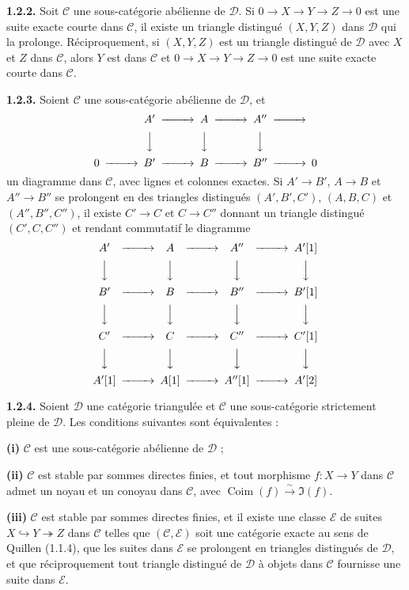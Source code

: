 \documentclass[12pt,a4paper]{article}
\theoremstyle{plain}
\theoremstyle{definition}
\theoremstyle{remark}
\DeclareMathOperator{\Coim}{Coim}
\newcommand{\cC}{\mathcal{C}}
\newcommand{\cD}{\mathcal{D}}
\newcommand{\cE}{\mathcal{E}}
\begin{document}
\smallskip

\noindent
\textbf{1.2.2.} Soit $\cC$ une sous-catégorie abélienne de $\cD$. Si $0 \to X \to Y \to Z \to 0$ est une suite exacte courte dans $\cC$, il existe un triangle distingué $(X, Y, Z)$ dans $\cD$ qui la prolonge. Réciproquement, si $(X, Y, Z)$ est un triangle distingué de $\cD$ avec $X$ et $Z$ dans $\cC$, alors $Y$ est dans $\cC$ et $0 \to X \to Y \to Z \to 0$ est une suite exacte courte dans $\cC$.

\smallskip

\noindent
\textbf{1.2.3.} Soient $\cC$ une sous-catégorie abélienne de $\cD$, et
\[
\begin{CD}
@. A' @>>> A @>>> A'' @>>> \\
@. @VVV @VVV @VVV @. \\
0 @>>> B' @>>> B @>>> B'' @>>> 0
\end{CD}
\]
un diagramme dans $\cC$, avec lignes et colonnes exactes. Si $A' \to B'$, $A \to B$ et $A'' \to B''$ se prolongent en des triangles distingués $(A', B', C')$, $(A, B, C)$ et $(A'', B'', C'')$, il existe $C' \to C$ et $C \to C''$ donnant un triangle distingué $(C', C, C'')$ et rendant commutatif le diagramme
\[
\begin{CD}
A' @>>> A @>>> A'' @>>> A'[1] \\
@VVV @VVV @VVV @VVV \\
B' @>>> B @>>> B'' @>>> B'[1] \\
@VVV @VVV @VVV @VVV \\
C' @>>> C @>>> C'' @>>> C'[1] \\
@VVV @VVV @VVV @VVV \\
A'[1] @>>> A[1] @>>> A''[1] @>>> A'[2]
\end{CD}
\]

\smallskip

\noindent
\textbf{1.2.4.} Soient $\cD$ une catégorie triangulée et $\cC$ une sous-catégorie strictement pleine de $\cD$. Les conditions suivantes sont équivalentes :

\smallskip

\noindent
\textbf{(i)} $\cC$ est une sous-catégorie abélienne de $\cD$ ;

\noindent
\textbf{(ii)} $\cC$ est stable par sommes directes finies, et tout morphisme $f : X \to Y$ dans $\cC$ admet un noyau et un conoyau dans $\cC$, avec $\Coim(f) \xrightarrow{\sim} \Im(f)$.

\smallskip

\noindent
\textbf{(iii)} $\cC$ est stable par sommes directes finies, et il existe une classe $\cE$ de suites $X \hookrightarrow Y \twoheadrightarrow Z$ dans $\cC$ telles que $(\cC, \cE)$ soit une catégorie exacte au sens de Quillen (1.1.4), que les suites dans $\cE$ se prolongent en triangles distingués de $\cD$, et que réciproquement tout triangle distingué de $\cD$ à objets dans $\cC$ fournisse une suite dans $\cE$.
\end{document}

